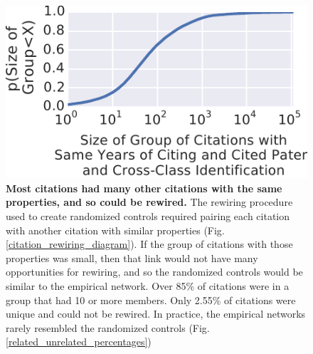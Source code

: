 \documentclass[]{svjour3}
\begin{document}
\begin{figure}[h]
\centering
\includegraphics[width=.7\textwidth]{figs/Citation_Group_Sizes.pdf} 
\caption{\textbf{Most citations had many other citations with the same properties, and so could be rewired.} The rewiring procedure used to create randomized controls required pairing each citation with another citation with similar properties (Fig. \ref{citation_rewiring_diagram}). If the group of citations with those properties was small, then that link would not have many opportunities for rewiring, and so the randomized controls would be similar to the empirical network. Over 85\% of citations were in a group that had 10 or more members. Only 2.55\% of citations were unique and could not be rewired. In practice, the empirical networks rarely resembled the randomized controls (Fig. \ref{related_unrelated_percentages})}\label{rewiring_groups}
\end{figure}
\end{document}
